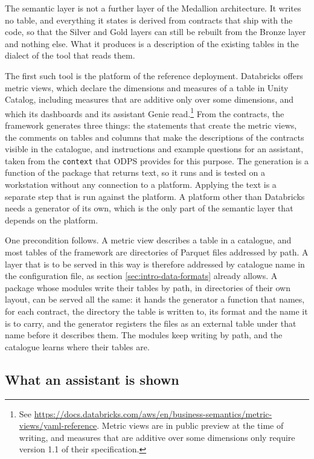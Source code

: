 \documentclass[a4paper, 11pt]{report}
\begin{document}
The semantic layer is not a further layer of the Medallion architecture. It writes no table, and everything it states is derived from contracts that ship with the code, so that the Silver and Gold layers can still be rebuilt from the Bronze layer and nothing else. What it produces is a description of the existing tables in the dialect of the tool that reads them.

The first such tool is the platform of the reference deployment. Databricks offers metric views, which declare the dimensions and measures of a table in Unity Catalog, including measures that are additive only over some dimensions, and which its dashboards and its assistant Genie read.\footnote{See \url{https://docs.databricks.com/aws/en/business-semantics/metric-views/yaml-reference}. Metric views are in public preview at the time of writing, and measures that are additive over some dimensions only require version 1.1 of their specification.} From the contracts, the framework generates three things: the statements that create the metric views, the comments on tables and columns that make the descriptions of the contracts visible in the catalogue, and instructions and example questions for an assistant, taken from the \verb|context| that ODPS provides for this purpose. The generation is a function of the package that returns text, so it runs and is tested on a workstation without any connection to a platform. Applying the text is a separate step that is run against the platform. A platform other than Databricks needs a generator of its own, which is the only part of the semantic layer that depends on the platform.

One precondition follows. A metric view describes a table in a catalogue, and most tables of the framework are directories of Parquet files addressed by path. A layer that is to be served in this way is therefore addressed by catalogue name in the configuration file, as section \ref{sec:intro-data-formats} already allows. A package whose modules write their tables by path, in directories of their own layout, can be served all the same: it hands the generator a function that names, for each contract, the directory the table is written to, its format and the name it is to carry, and the generator registers the files as an external table under that name before it describes them. The modules keep writing by path, and the catalogue learns where their tables are.

\subsection{What an assistant is shown}
\end{document}
